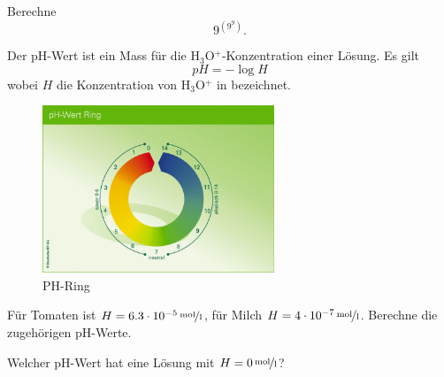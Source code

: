 \documentclass[%
11pt,%
twoside,%
titlepage,%
german,%
headsepline%
]{scrartcl}
\begin{document}
\begin{ueb}\label{menschvsmaschine}
  Berechne $$9^{(9^9)}.$$
\end{ueb}

\begin{ueb}[pH-Wert]\label{pH}
  Der \unit{pH}-Wert ist ein Mass für die H$_3$O$^+$-Konzentration einer Lösung. Es gilt
  $$\unit{pH} = -\log{H}$$ wobei $H$ die Konzentration von H$_3$O$^+$
   in  bezeichnet.
   \begin{figure}
\begin{center}
  \includegraphics[width=0.618\textwidth]{pictures/phring}
  \caption{PH-Ring}
\end{center}
\end{figure}  
  \begin{enumeratea}
    \item Für Tomaten ist $H=\unitfrac[6.3\cdot10^{-5}]{mol}{l}$,
    für Milch $H=\unitfrac[4\cdot10^{-7}]{mol}{l}$. Berechne
    die zugehörigen \unit{pH}-Werte.
    \item Welcher \unit{pH}-Wert hat eine Lösung mit
    $H=\unitfrac[0]{mol}{l}$?
  \end{enumeratea}
\end{ueb}
\end{document}
